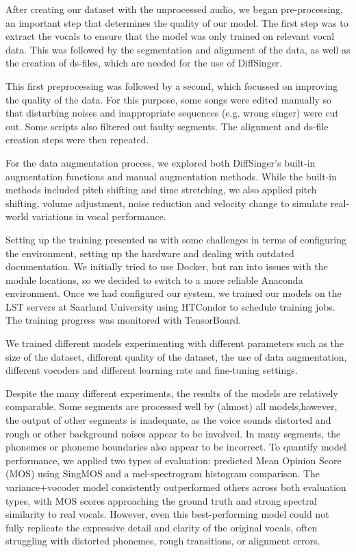 \documentclass[a4paper]{article}
\begin{document}
	After creating our dataset with the unprocessed audio, we began pre-processing, an important step that determines the quality of our model. The first step was to extract the vocals to ensure that the model was only trained on relevant vocal data. This was followed by the segmentation and alignment of the data, as well as the creation of ds-files, which are needed for the use of DiffSinger.
	
	This first preprocessing was followed by a second, which focussed on improving the quality of the data. For this purpose, some songs were edited manually so that disturbing noises and inappropriate sequences (e.g. wrong singer) were cut out. Some scripts also filtered out faulty segments. The alignment and ds-file creation steps were then repeated.
	
	For the data augmentation process, we explored both DiffSinger's built-in augmentation functions and manual augmentation methods. While the built-in methods included pitch shifting and time stretching, we also applied pitch shifting, volume adjustment, noise reduction and velocity change to simulate real-world variations in vocal performance.
	
	
	Setting up the training presented us with some challenges in terms of configuring the environment, setting up the hardware and dealing with outdated documentation. We initially tried to use Docker, but ran into issues with the module locations, so we decided to switch to a more reliable Anaconda environment. Once we had configured our system, we trained our models on the LST servers at Saarland University using HTCondor to schedule training jobs. The training progress was monitored with TensorBoard.
	
	We trained different models experimenting with different parameters such as the size of the dataset, different quality of the dataset, the use of data augmentation, different vocoders and different learning rate and fine-tuning settings.
	
	
	Despite the many different experiments, the results of the models are relatively comparable. Some segments are processed well by (almost) all models,however, the output of other segments is inadequate, as the voice sounds distorted and rough or other background noises appear to be involved. In many segments, the phonemes or phoneme boundaries also appear to be incorrect. To quantify model performance, we applied two types of evaluation: predicted Mean Opinion Score (MOS) using SingMOS and a mel-spectrogram histogram comparison. The variance+vocoder model consistently outperformed others across both evaluation types, with MOS scores approaching the ground truth and strong spectral similarity to real vocals. However, even this best-performing model could not fully replicate the expressive detail and clarity of the original vocals, often struggling with distorted phonemes, rough transitions, or alignment errors. 
	
\end{document}
